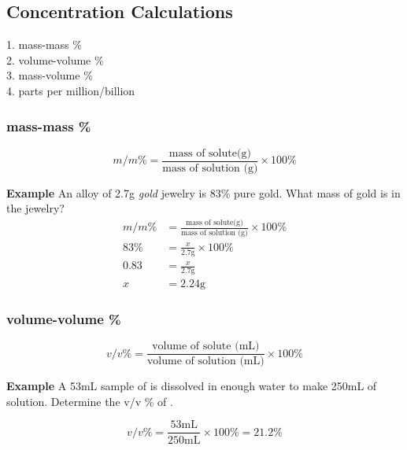 \documentclass[11pt]{article}
\begin{document}
    \subsection{Concentration Calculations}
    1. mass-mass \% \\
    2. volume-volume \% \\
    3. mass-volume \% \\
    4. parts per million/billion

    \subsubsection{mass-mass \%}

    \begin{equation*}
        m/m \% = \frac{\text{mass of solute(g)}}{\text{mass of solution (g)}} \times 100 \%
    \end{equation*}

    \textbf{Example} An alloy of 2.7g \emph{gold} jewelry is 83\% pure gold. What mass of gold is in the jewelry?
    \begin{equation*}
        \begin{aligned}
            m/m \% &= \frac{\text{mass of solute(g)}}{\text{mass of solution (g)}} \times 100 \% \\
            83 \% &= \frac{x}{2.7\text{g}} \times 100 \% \\
            0.83 &= \frac{x}{2.7\text{g}} \\
            x &= 2.24\text{g}
        \end{aligned}
    \end{equation*}

    \subsubsection{volume-volume \%}

    \begin{equation*}
        v/v \% = \frac{\text{volume of solute (mL)}}{\text{volume of solution (mL)}} \times 100 \%
    \end{equation*}

    \textbf{Example} A 53mL sample of  is dissolved in enough water to make 250mL of solution. Determine the v/v \% of .

    \begin{equation*}
        v/v \% = \frac{53\text{mL}}{250\text{mL}} \times 100 \% = 21.2 \%
    \end{equation*}
\end{document}
